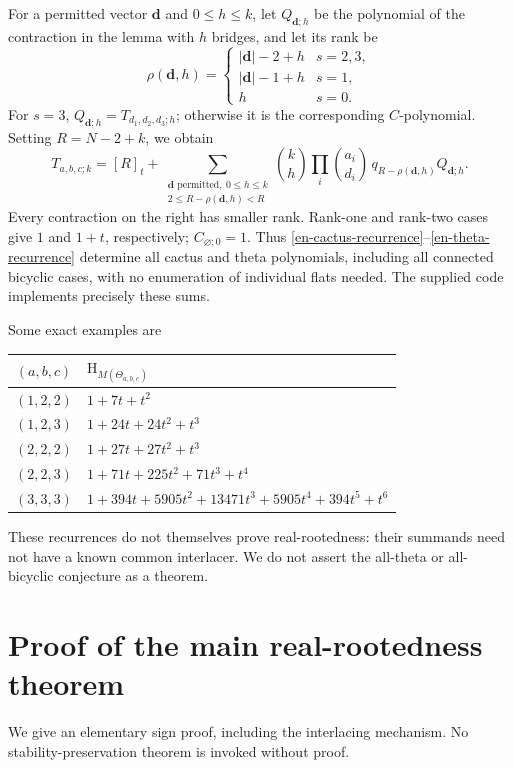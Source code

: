 \documentclass[12pt]{amsart}
\theoremstyle{definition}
\theoremstyle{remark}
\numberwithin{equation}{section}
\newcommand{\HCh}{\mathrm{H}}
\begin{document}
For a permitted vector $\boldsymbol d$ and $0\leq h\leq k$, let $Q_{\boldsymbol d;h}$ be the polynomial of the contraction in the lemma with $h$ bridges, and let its rank be
\[
 \rho(\boldsymbol d,h)=
 \begin{cases}|\boldsymbol d|-2+h&s=2,3,\\
 |\boldsymbol d|-1+h&s=1,\\h&s=0.
 \end{cases}
\]
For $s=3$, $Q_{\boldsymbol d;h}=T_{d_1,d_2,d_3;h}$; otherwise it is the corresponding $C$-polynomial. Setting $R=N-2+k$, we obtain
\begin{equation}\label{en-theta-recurrence}
 T_{a,b,c;k}=[R]_t+
 \sum_{\substack{\boldsymbol d\text{ permitted},\ 0\leq h\leq k\\
                  2\leq R-\rho(\boldsymbol d,h)<R}}
 \binom{k}{h}\prod_i\binom{a_i}{d_i}\,
 q_{R-\rho(\boldsymbol d,h)}Q_{\boldsymbol d;h}.
\end{equation}
Every contraction on the right has smaller rank. Rank-one and rank-two cases give $1$ and $1+t$, respectively; $C_{\varnothing;0}=1$. Thus \eqref{en-cactus-recurrence}--\eqref{en-theta-recurrence} determine all cactus and theta polynomials, including all connected bicyclic cases, with no enumeration of individual flats needed. The supplied code implements precisely these sums.

Some exact examples are
\begin{center}\small
\begin{tabular}{c|l}
$(a,b,c)$&$\HCh_{M(\Theta_{a,b,c})}$\\\hline
$(1,2,2)$&$1+7t+t^2$\\
$(1,2,3)$&$1+24t+24t^2+t^3$\\
$(2,2,2)$&$1+27t+27t^2+t^3$\\
$(2,2,3)$&$1+71t+225t^2+71t^3+t^4$\\
$(3,3,3)$&$1+394t+5905t^2+13471t^3+5905t^4+394t^5+t^6$
\end{tabular}
\end{center}
These recurrences do not themselves prove real-rootedness: their summands need not have a known common interlacer. We do not assert the all-theta or all-bicyclic conjecture as a theorem.

\section{Proof of the main real-rootedness theorem}
We give an elementary sign proof, including the interlacing mechanism. No stability-preservation theorem is invoked without proof.
\end{document}
